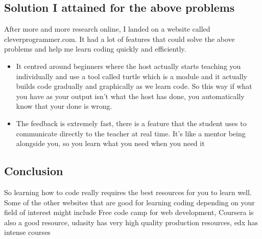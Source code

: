 \documentclass{article}
\begin{document}
\subsection{Solution I attained for the above problems}
After more and more research online, I landed on a website called cleverprogrammer.com. It had a lot of features that could solve the above problems and help me learn coding quickly and efficiently. 
\begin{itemize}
\item It centred around beginners where the host actually starts teaching you individually and use a tool called turtle which is a module and it actually builds code gradually and graphically as we learn code. So this way if what you have as your output isn’t what the host has done, you automatically know that your done is wrong.
\item The feedback is extremely fast, there is a feature that the student uses to communicate directly to the teacher at real time. It’s like a mentor being alongside you, so you learn what you need when you need it
\end{itemize}
\subsection{ Conclusion}
So learning how to code really requires the best resources for you to learn well. Some of the other websites that are good for learning coding depending on your field of interest might include Free code camp for web development, Coursera is also a good resource, udasity has very high quality production resources, edx has intense courses
\end{document}
